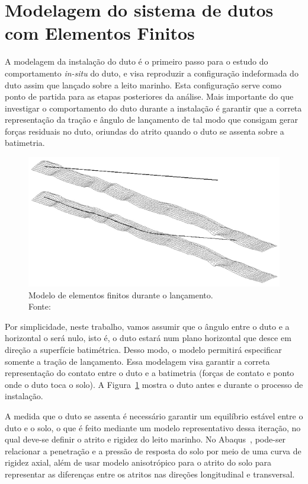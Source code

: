\section{Modelagem do sistema de dutos com Elementos Finitos}

A modelagem da instalação do duto é o primeiro passo para o estudo do comportamento \textit{in-situ} do duto, e visa reproduzir a configuração indeformada do duto assim que lançado sobre a leito marinho.
Esta configuração serve como ponto de partida para as etapas posteriores da análise.
Mais importante do que investigar o comportamento do duto durante a instalação é garantir que a correta representação da tração e ângulo de lançamento de tal modo que consigam gerar forças residuais no duto, oriundas do atrito quando o duto se assenta sobre a batimetria.

\begin{figure}[th!]
    \centering
    \includegraphics[width=0.7\linewidth]{imagens/lancamento_do_duto}
    \caption[Modelo de elementos finitos durante o lançamento]{Modelo de elementos finitos durante o lançamento.\\Fonte:~\cite{Bai2014}}\label{fig:lancamentododuto}
\end{figure}

Por simplicidade, neste trabalho, vamos assumir que o ângulo entre o duto e a horizontal o será nulo, isto é, o duto estará num plano horizontal que desce em direção a superfície batimétrica.
Desso modo, o modelo permitirá especificar somente a tração de lançamento.
Essa modelagem visa garantir a correta representação do contato entre o duto e a batimetria (forças de contato e ponto onde o duto toca o solo).
A Figura~\ref{fig:lancamentododuto} mostra o duto antes e durante o processo de instalação.

A medida que o duto se assenta é necessário garantir um equilíbrio estável entre o duto e o solo, o que é feito mediante um modelo representativo dessa iteração, no qual deve-se definir o atrito e rigidez do leito marinho.
No Abaqus~\cite{Simulia2018}, pode-ser relacionar a penetração e a pressão de resposta do solo por meio de uma curva de rigidez axial, além de usar modelo anisotrópico para o atrito do solo para representar as diferenças entre os atritos nas direções longitudinal e transversal.
